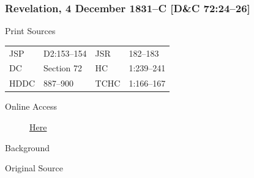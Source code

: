 {		%
		\subsubsection{Revelation, 4 December 1831--C [D\&C 72:24--26]}
			\label{EMS-1831-JS-4-DEC-1831-C}
		
			\begin{description}
				\item[Print Sources]
			\end{description}

				\begin{tabular}{p{0.5in}p{1in}p{0.5in}p{1in}}
				JSP	 	& D2:153--154	& JSR 		& 182--183 \\
				DC	 	& Section 72 	& HC 		& 1:239--241 \\
				HDDC 	& 887--900		& TCHC 		& 1:166--167 \\
				\end{tabular}
			
			\begin{description}
				\item[Online Access] \href{https://www.josephsmithpapers.org/paper-summary/revelation-4-december-1831-c-dc-7224-26/1}{Here}
			\end{description}
			
			\begin{description}
				\item[Background]
			\end{description}
			
			
			\begin{description}
				\item[Original Source]
			\end{description}
			
			
}
